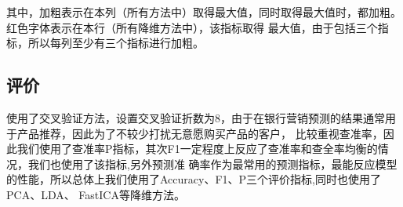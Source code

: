 \documentclass{acm_proc_article-sp}
\begin{document}
\begin{table}[!ht]
\centering
\caption{未均衡实验结果}
\label{WJHSY}
\end{table}
其中，加粗表示在本列（所有方法中）取得最大值，同时取得最大值时，都加粗。红色字体表示在本行（所有降维方法中），该指标取得
最大值，由于包括三个指标，所以每列至少有三个指标进行加粗。

\subsection{\textsf{评价}}

使用了交叉验证方法，设置交叉验证折数为8，由于在银行营销预测的结果通常用于产品推荐，因此为了不较少打扰无意愿购买产品的客户，
比较重视查准率，因此我们使用了查准率P指标，其次F1一定程度上反应了查准率和查全率均衡的情况，我们也使用了该指标,另外预测准
确率作为最常用的预测指标，最能反应模型的性能，所以总体上我们使用了Accuracy、F1、P三个评价指标,同时也使用了PCA、LDA、
FastICA等降维方法。
\end{document}
